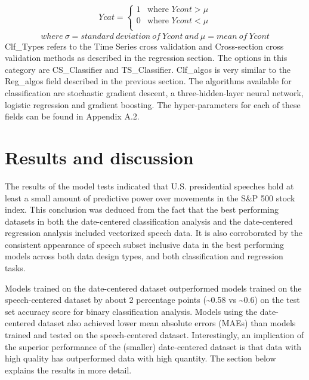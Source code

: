 \documentclass[11pt,preprint, authoryear]{elsarticle}
\numberwithin{equation}{section}
\numberwithin{figure}{section}
\numberwithin{table}{section}
\begin{document}
\begin{align}
Ycat=   \left\{
\begin{array}{ll}
      1  &\text{where } Ycont>\mu \label{eq2} \\
      0  &\text{where } Ycont<\mu \\
\end{array}
\right.
\end{align} \[
where \ \sigma = standard \ deviation \ of \ Ycont \ and \ \mu = mean \ of \ Ycont
\] Clf\_Types refers to the Time Series cross validation and
Cross-section cross validation methods as described in the regression
section. The options in this category are CS\_Classifier and
TS\_Classifier. Clf\_algos is very similar to the Reg\_algos field
described in the previous section. The algorithms available for
classification are stochastic gradient descent, a three-hidden-layer
neural network, logistic regression and gradient boosting. The
hyper-parameters for each of these fields can be found in Appendix A.2.

\hypertarget{results-and-discussion}{%
\section{\texorpdfstring{Results and discussion
\label{results}}{Results and discussion }}\label{results-and-discussion}}

The results of the model tests indicated that U.S. presidential speeches
hold at least a small amount of predictive power over movements in the
S\&P 500 stock index. This conclusion was deduced from the fact that the
best performing datasets in both the date-centered classification
analysis and the date-centered regression analysis included vectorized
speech data. It is also corroborated by the consistent appearance of
speech subset inclusive data in the best performing models across both
data design types, and both classification and regression tasks.

Models trained on the date-centered dataset outperformed models trained
on the speech-centered dataset by about 2 percentage points
(\textasciitilde0.58 vs \textasciitilde0.6) on the test set accuracy
score for binary classification analysis. Models using the date-centered
dataset also achieved lower mean absolute errors (MAEs) than models
trained and tested on the speech-centered dataset. Interestingly, an
implication of the superior performance of the (smaller) date-centered
dataset is that data with high quality has outperformed data with high
quantity. The section below explains the results in more detail.
\end{document}
